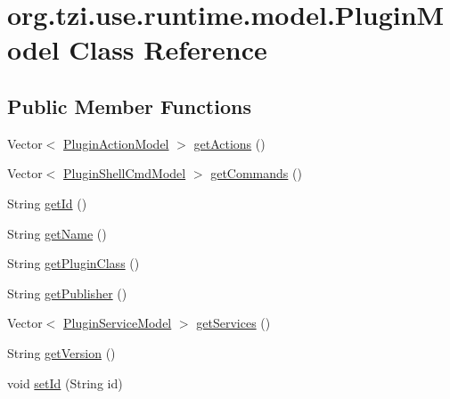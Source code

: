 \hypertarget{classorg_1_1tzi_1_1use_1_1runtime_1_1model_1_1_plugin_model}{\section{org.\-tzi.\-use.\-runtime.\-model.\-Plugin\-Model Class Reference}
\label{classorg_1_1tzi_1_1use_1_1runtime_1_1model_1_1_plugin_model}
}
\subsection*{Public Member Functions}
\begin{DoxyCompactItemize}
\item 
Vector$<$ \hyperlink{classorg_1_1tzi_1_1use_1_1runtime_1_1model_1_1_plugin_action_model}{Plugin\-Action\-Model} $>$ \hyperlink{classorg_1_1tzi_1_1use_1_1runtime_1_1model_1_1_plugin_model_a3079c7d58ed39aefa7e55c3fa89ac726}{get\-Actions} ()
\item 
Vector$<$ \hyperlink{classorg_1_1tzi_1_1use_1_1runtime_1_1model_1_1_plugin_shell_cmd_model}{Plugin\-Shell\-Cmd\-Model} $>$ \hyperlink{classorg_1_1tzi_1_1use_1_1runtime_1_1model_1_1_plugin_model_a3a7450ff200fbab466705ce1705a3975}{get\-Commands} ()
\item 
String \hyperlink{classorg_1_1tzi_1_1use_1_1runtime_1_1model_1_1_plugin_model_a29bb9ad9a76bb60765970c807f6ddc8a}{get\-Id} ()
\item 
String \hyperlink{classorg_1_1tzi_1_1use_1_1runtime_1_1model_1_1_plugin_model_ac283677da687b9e0691979621cc885a4}{get\-Name} ()
\item 
String \hyperlink{classorg_1_1tzi_1_1use_1_1runtime_1_1model_1_1_plugin_model_a0bd9cc033ffc0c6a1c3815647bc96576}{get\-Plugin\-Class} ()
\item 
String \hyperlink{classorg_1_1tzi_1_1use_1_1runtime_1_1model_1_1_plugin_model_a7494a7c9175ccd16ac99f9ab74a2a629}{get\-Publisher} ()
\item 
Vector$<$ \hyperlink{classorg_1_1tzi_1_1use_1_1runtime_1_1model_1_1_plugin_service_model}{Plugin\-Service\-Model} $>$ \hyperlink{classorg_1_1tzi_1_1use_1_1runtime_1_1model_1_1_plugin_model_a888e378c4532c072e72f23251db3cd4e}{get\-Services} ()
\item 
String \hyperlink{classorg_1_1tzi_1_1use_1_1runtime_1_1model_1_1_plugin_model_a1bb81ed8616c14eae57d0aece3429aa7}{get\-Version} ()
\item 
void \hyperlink{classorg_1_1tzi_1_1use_1_1runtime_1_1model_1_1_plugin_model_ab43a120ff426c04947368d4a2328b9b2}{set\-Id} (String id)

\end{DoxyCompactItemize}
